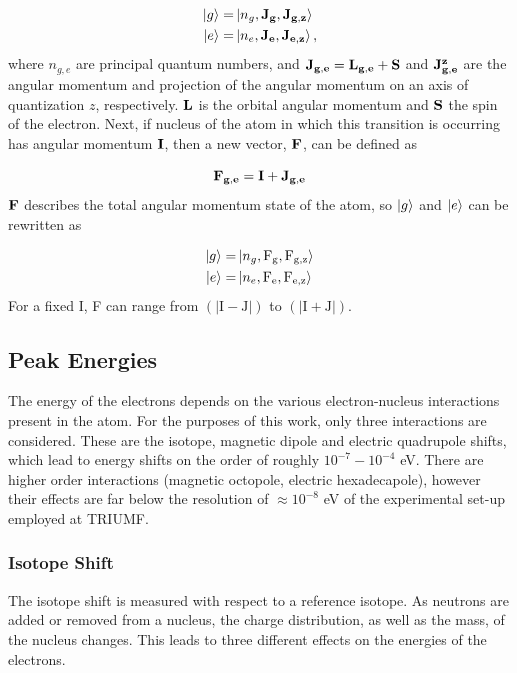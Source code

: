 \begin{align}
\ket{g} =& \ket{n_g,\mathrm{\bf{J}_g,J_{g,z}}}\\
\ket{e} =& \ket{n_e,\mathrm{\bf{J}_e,J_{e,z}}},
\end{align}
where $n_{g,e}$ are principal quantum numbers, and $\bf{J}_{g,e}=\bf{L}_{g,e}+S$ and $\bf{J}_{g,e}^z$ are the angular momentum and projection of the angular momentum on an axis of quantization $z$, respectively. $\bf{L}$ is the orbital angular momentum and $\bf{S}$ the spin of the electron. Next, if nucleus of the atom in which this transition is occurring has angular momentum $\bf{I}$, then a new vector, $\bf{F}$, can be defined as 

\begin{equation}
\bf{F_{g,e}} = \bf{I} + \bf{J}_{g,e}
\end{equation}
$\bf{F}$ describes the total angular momentum state of the atom, so $\ket{g}$ and $\ket{e}$ can be rewritten as

\begin{align}
\ket{g} =& \ket{n_g,\mathrm{F_g, F_{g,z}}}\\
\ket{e} =& \ket{n_e,\mathrm{F_e, F_{e,z}}}
\end{align}
For a fixed I, F can range from $(|\mathrm{I-J}|)$ to $(|\mathrm{I+J}|)$.
\subsection{Peak Energies}
The energy of the electrons depends on the various electron-nucleus interactions present in the atom. For the purposes of this work, only three interactions are considered. These are the isotope, magnetic dipole and electric quadrupole shifts, which lead to energy shifts on the order of roughly $10^{-7}-10^{-4}$ eV\cite{ModAN}. There are higher order interactions (magnetic octopole, electric hexadecapole), however their effects are far below the resolution of $\approx 10^{-8}$ eV of the experimental set-up employed at TRIUMF\cite{GA69}.

\subsubsection{Isotope Shift}
The isotope shift is measured with respect to a reference isotope. As neutrons are added or removed from a nucleus, the charge distribution, as well as the mass, of the nucleus changes. This leads to three different effects on the energies of the electrons. 


